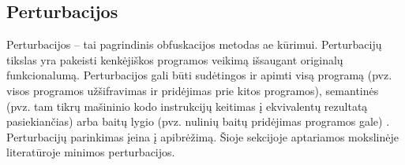 \subsection{Perturbacijos}\label{sec:literature:perturbations}

Perturbacijos -- tai pagrindinis obfuskacijos metodas \ac{ae} kūrimui.
Perturbacijų tikslas yra pakeisti kenkėjiškos programos veikimą išsaugant
originalų funkcionalumą. Perturbacijos gali būti sudėtingos ir apimti visą
programą (pvz. visos programos užšifravimas ir pridėjimas prie kitos
programos), semantinės (pvz. tam tikrų mašininio kodo instrukcijų keitimas į
ekvivalentų rezultatą pasiekiančias) arba baitų lygio (pvz. nulinių baitų
pridėjimas programos gale) \cite{huGeneratingAdversarialMalware2017}. Perturbacijų parinkimas įeina į
 apibrėžimą. Šioje sekcijoje aptariamos mokslinėje
literatūroje minimos perturbacijos.
